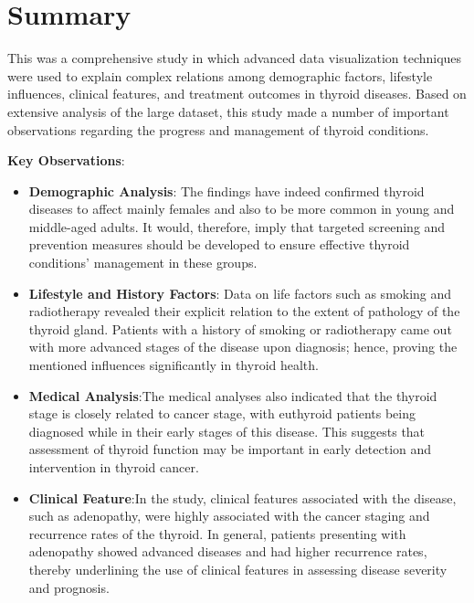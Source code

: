 \documentclass[12pt]{article}
\begin{document}
\newpage

\section{Summary}
This was a comprehensive study in which advanced data visualization techniques were used to explain complex relations among demographic factors, lifestyle influences, clinical features, and treatment outcomes in thyroid diseases. Based on extensive analysis of the large dataset, this study made a number of important observations regarding the progress and management of thyroid conditions.

\vspace{0.4cm}
\textbf{Key Observations}: 
\begin{itemize}


    
\item \textbf{Demographic Analysis}: The findings have indeed confirmed thyroid diseases to affect mainly females and also to be more common in young and middle-aged adults. It would, therefore, imply that targeted screening and prevention measures should be developed to ensure effective thyroid conditions' management in these groups.

\item \textbf{Lifestyle and History Factors}: Data on life factors such as smoking and radiotherapy revealed their explicit relation to the extent of pathology of the thyroid gland. Patients with a history of smoking or radiotherapy came out with more advanced stages of the disease upon diagnosis; hence, proving the mentioned influences significantly in thyroid health.

\item \textbf{Medical Analysis}:The medical analyses also indicated that the thyroid stage is closely related to cancer stage, with euthyroid patients being diagnosed while in their early stages of this disease. This suggests that assessment of thyroid function may be important in early detection and intervention in thyroid cancer.

\item \textbf{Clinical Feature}:In the study, clinical features associated with the disease, such as adenopathy, were highly associated with the cancer staging and recurrence rates of the thyroid. In general, patients presenting with adenopathy showed advanced diseases and had higher recurrence rates, thereby underlining the use of clinical features in assessing disease severity and prognosis.


\end{itemize}
\end{document}
